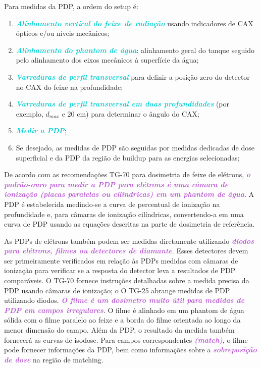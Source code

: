 \documentclass[11pt,a4paper]{article}
\newcounter{exemplo}
\begin{document}
	Para medidas da PDP, a ordem do setup é:

	\begin{enumerate}[label=\textcolor{CarnationPink}{\arabic*${}^\circ $}]
		\item \textcolor{DarkTurquoise}{\textbf{\textit{Alinhamento vertical do feixe de radiação}}} usando indicadores de CAX ópticos e/ou níveis mecânicos;
		\item \textcolor{DarkTurquoise}{\textbf{\textit{Alinhamento do phantom de água}}}: alinhamento geral do tanque seguido pelo alinhamento dos eixos mecânicos à superfície da água;
		\item \textcolor{DarkTurquoise}{\textbf{\textit{Varreduras de perfil transversal}}} para definir a posição zero do detector no CAX do feixe na profundidade;
		\item \textcolor{DarkTurquoise}{\textbf{\textit{Varreduras de perfil transversal em duas profundidades}}} (por exemplo, $d_{max}$ e 20 cm) para determinar o ângulo do CAX;
		\item \textcolor{DarkTurquoise}{\textbf{\textit{Medir a PDP}}};
		\item Se desejado, as medidas de PDP são seguidas por medidas dedicadas de dose superficial e da PDP da região de buildup para as energias selecionadas;
	\end{enumerate}

	De acordo com as recomendações TG-70 para dosimetria de feixe de elétrons, \textcolor{MediumOrchid}{\textbf{\textit{o padrão-ouro para medir a PDP para elétrons é uma câmara de ionização (placas paralelas ou cilíndricas) em um phantom de água}}}. A PDP é estabelecida medindo-se a curva de percentual de ionização na profundidade e, para câmaras de ionização cilíndricas, convertendo-a em uma curva de PDP usando as equações descritas na parte de dosimetria de referência. 
	
	As PDPs de elétrons também podem ser medidas diretamente utilizando \textcolor{MediumOrchid}{\textbf{\textit{diodos para elétrons, filmes ou detectores de diamante}}}. Esses detectores devem ser primeiramente verificados em relação às PDPs medidas com câmaras de ionização para verificar se a resposta do detector leva a resultados de PDP comparáveis. O TG-70 fornece instruções detalhadas sobre a medida precisa da PDP usando câmaras de ionização; o O TG-25 abrange medidas de PDP utilizando diodos. \textcolor{MediumOrchid}{\textbf{\textit{O filme é um dosímetro muito útil para medidas de PDP em campos irregulares}}}. O filme é alinhado em um phantom de água sólida com o filme paralelo ao feixe e a borda do filme orientada ao longo da menor dimensão do campo. Além da PDP, o resultado da medida também fornecerá as curvas de isodose. Para campos correspondentes \textcolor{MediumOrchid}{\textbf{\textit{(match)}}}, o filme pode fornecer informações da PDP, bem como informações sobre a \textcolor{MediumOrchid}{\textbf{\textit{sobreposição de dose}}} na região de matching.
	
\end{document}
